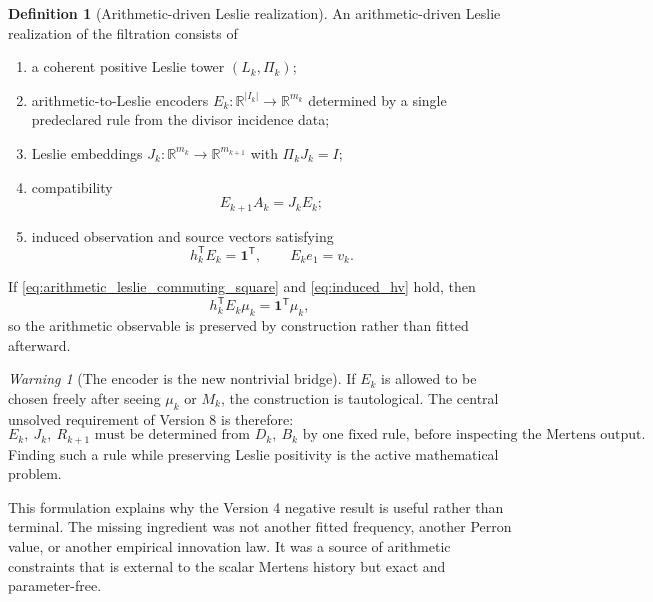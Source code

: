 \documentclass[11pt]{amsart}
\numberwithin{equation}{section}
\theoremstyle{plain}
\theoremstyle{definition}
\newtheorem{definition}[theorem]{Definition}
\theoremstyle{remark}
\newtheorem{warning}[theorem]{Warning}
\begin{document}
\begin{definition}[Arithmetic-driven Leslie realization]
\label{def:arithmetic_driven_leslie}
An arithmetic-driven Leslie realization of the filtration consists of
\begin{enumerate}
\item a coherent positive Leslie tower $(L_k,\Pi_k)$;
\item arithmetic-to-Leslie encoders
$E_k:\mathbb R^{|I_k|}\to\mathbb R^{m_k}$ determined by a single
predeclared rule from the divisor incidence data;
\item Leslie embeddings $J_k:\mathbb R^{m_k}\to\mathbb R^{m_{k+1}}$
with $\Pi_kJ_k=I$;
\item compatibility
\begin{equation}
\boxed{E_{k+1}A_k=J_kE_k;}
\label{eq:arithmetic_leslie_commuting_square}
\end{equation}
\item induced observation and source vectors satisfying
\begin{equation}
h_k^{\mathsf T}E_k=\mathbf 1^{\mathsf T},
\qquad
E_ke_1=v_k.
\label{eq:induced_hv}
\end{equation}
\end{enumerate}
\end{definition}

If \eqref{eq:arithmetic_leslie_commuting_square} and
\eqref{eq:induced_hv} hold, then
\begin{equation}
h_k^{\mathsf T}E_k\mu_k
=
\mathbf 1^{\mathsf T}\mu_k,
\label{eq:observable_commutes}
\end{equation}
so the arithmetic observable is preserved by construction rather than fitted afterward.

\begin{warning}[The encoder is the new nontrivial bridge]
\label{warn:encoder_tautology}
If $E_k$ is allowed to be chosen freely after seeing $\mu_k$ or $M_k$, the construction is
tautological.  The central unsolved requirement of Version 8 is therefore:
\[
\boxed{
E_k,\ J_k,\ R_{k+1}
\text{ must be determined from }
D_k,\ B_k
\text{ by one fixed rule, before inspecting the Mertens output.}
}
\label{eq:canonical_bridge_requirement}
\]
Finding such a rule while preserving Leslie positivity is the active mathematical problem.
\end{warning}

This formulation explains why the Version 4 negative result is useful rather than terminal.
The missing ingredient was not another fitted frequency, another Perron value, or another
empirical innovation law.  It was a source of arithmetic constraints that is external to the
scalar Mertens history but exact and parameter-free.
\end{document}
